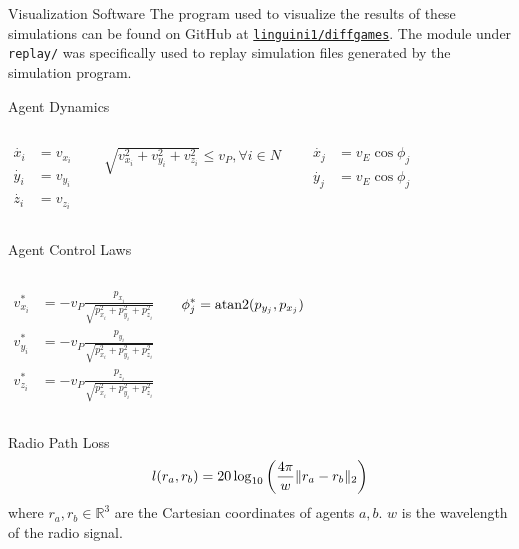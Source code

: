 \appendix

\begin{frame}{Visualization Software}
	The program used to visualize the results of these simulations can be found on
	GitHub at
	\href{https://github.com/linguini1/diffgames}{\texttt{linguini1/diffgames}}.
	The module under \texttt{replay/} was specifically used to replay simulation
	files generated by the simulation program.
\end{frame}

\begin{frame}{Agent Dynamics}
	\begin{columns}
		\begin{align*}
			\dot{x_i} & = v_{x_i} \\
			\dot{y_i} & = v_{y_i} \\
			\dot{z_i} & = v_{z_i}
		\end{align*}

		\begin{align*}
			\sqrt{v_{x_i}^2 + v_{y_i}^2 + v_{z_i}^2} \le v_P, \forall i \in N
		\end{align*}

		\begin{align*}
			\dot{x_j} & = v_E \cos \phi_j \\
			\dot{y_j} & = v_E \cos \phi_j
		\end{align*}
	\end{columns}
\end{frame}

\begin{frame}{Agent Control Laws}
	\begin{columns}
		\column{0.5\textwidth}
		\begin{align*}
			v_{x_i}^* & = -v_P \frac{p_{x_i}}{\sqrt{p_{x_i}^2 + p_{y_i}^2 + p_{z_i}^2}} \\
			v_{y_i}^* & = -v_P \frac{p_{y_i}}{\sqrt{p_{x_i}^2 + p_{y_i}^2 + p_{z_i}^2}} \\
			v_{z_i}^* & = -v_P \frac{p_{z_i}}{\sqrt{p_{x_i}^2 + p_{y_i}^2 + p_{z_i}^2}}
		\end{align*}

		\column{0.5\textwidth}
		\begin{equation}
			\phi_j^* = \operatorname{atan2}(p_{y_j}, p_{x_j})
		\end{equation}
	\end{columns}
\end{frame}

\begin{frame}{Radio Path Loss}
	\begin{align*}
		l(r_a, r_b) = 20 \log_{10}\left(\frac{4 \pi}{w} \lVert r_a - r_b \rVert_2\right)
	\end{align*}
	where $r_a, r_b \in \mathbb{R}^3$ are the Cartesian coordinates of agents
	$a, b$. $w$ is the wavelength of the radio signal.
\end{frame}

